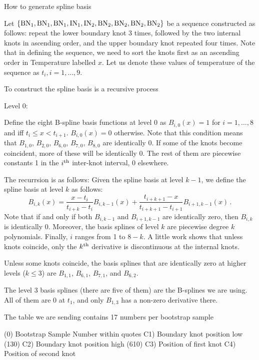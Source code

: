 \documentclass{article}
\newcommand\Bn[1]{{\rm BN}_{#1}}
\newcommand\In[1]{{\rm IN}_{#1}}
\begin{document}
How to generate spline basis

Let \(\{\Bn1,\Bn1,\Bn1,\In1,\In2,\Bn2,\Bn2,\Bn2,\Bn2\}\) be a sequence
constructed as follows: repeat the lower boundary knot 3 times,
followed by the two internal knots in ascending order, and the upper
boundary knot repeated four times. Note that in defining the sequence,
we need to sort the knots first as an ascending order in Temperature
labelled $x$.  Let us denote these values of temperature of the 
sequence as \(t_i, i=1,\ldots,9\).

To construct the spline basis is a recursive process

Level 0:

Define the eight B-spline basis functions at level 0 as \(B_{i,0} (x) = 1\) 
for \(i=1,\ldots,8\) and iff \(t_i \leq x < t_{i+1}\).  \(B_{i,0} (x) = 0\)  otherwise.
Note that this condition means that \(B_{1,0}\), \(B_{2,0}\),
\(B_{6,0}\), \(B_{7,0}\), \(B_{8,0}\) are identically 0. If some of
the knots become coincident, more of these will be identically 0.  The rest
of them are piecewise constants 1 in the \(i^{\rm th}\) inter-knot
interval, 0 elsewhere.

The recurrsion is as follows: Given the spline basis at level
\(k-1\), we define the spline basis at level \(k\) as follows:
\[
B_{i,k}(x) = \frac{x-t_i}{t_{i+k}-t_i} B_{i,k-1}(x) + 
               \frac{t_{i+k+1}-x}{t_{i+k+1}-t_{i+1}} B_{i+1,k-1}(x)\,.
\]
Note that if and only if both \(B_{i,k-1}\) and \(B_{i+1,k-1}\) are
identically zero, then \(B_{i,k}\) is identically 0.  Moreover, the
basis splines of level \(k\) are piecewise degree \(k\)
polynomials. Finally, \(i\) ranges from 1 to \(8-k\).  A little work
shows that unless knots coincide, only the \(k^{\rm th}\) derivative
is discontinuous at the internal knots.

Unless some knots coincide, the basis splines that are identically zero at
higher levels ($k \leq 3$) are \(B_{1,1}\), \(B_{6,1}\), \(B_{7,1}\), and
\(B_{6,2}\).

The level 3 basis splines (there are five of them) are the B-splines
we are using.  All of them are 0 at \(t_1\), and only \(B_{1,3}\) has
a non-zero derivative there.  

The table we are sending contains 17 numbers per bootstrap sample

(0) Bootstrap Sample Number within quotes
C1) Boundary knot position low  (130)
C2) Boundary knot position high  (610)
C3) Position of first knot
C4) Position of second knot
\end{document}
